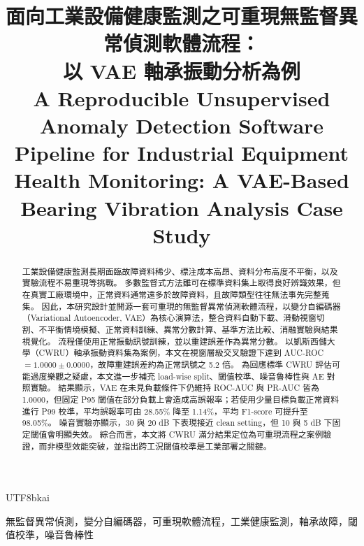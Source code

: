 \documentclass[conference]{IEEEtran}
\begin{document}
\begin{CJK}{UTF8}{bkai}

\title{面向工業設備健康監測之可重現無監督異常偵測軟體流程：\\
以 VAE 軸承振動分析為例\\
\large A Reproducible Unsupervised Anomaly Detection Software Pipeline for Industrial Equipment Health Monitoring: A VAE-Based Bearing Vibration Analysis Case Study}

\author{
}

\maketitle

\begin{abstract}
工業設備健康監測長期面臨故障資料稀少、標注成本高昂、資料分布高度不平衡，以及實驗流程不易重現等挑戰。
多數監督式方法雖可在標準資料集上取得良好辨識效果，但在真實工廠環境中，正常資料通常遠多於故障資料，且故障類型往往無法事先完整蒐集。
因此，本研究設計並開源一套可重現的無監督異常偵測軟體流程，以變分自編碼器（Variational Autoencoder, VAE）為核心演算法，整合資料自動下載、滑動視窗切割、不平衡情境模擬、正常資料訓練、異常分數計算、基準方法比較、消融實驗與結果視覺化。
流程僅使用正常振動訊號訓練，並以重建誤差作為異常分數。
以凱斯西儲大學（CWRU）軸承振動資料集為案例，本文在視窗層級交叉驗證下達到 AUC-ROC $=1.0000\pm0.0000$，故障重建誤差約為正常訊號之 5.2 倍。
為回應標準 CWRU 評估可能過度樂觀之疑慮，本文進一步補充 load-wise split、閾值校準、噪音魯棒性與 AE 對照實驗。
結果顯示，VAE 在未見負載條件下仍維持 ROC-AUC 與 PR-AUC 皆為 1.0000，但固定 P95 閾值在部分負載上會造成高誤報率；若使用少量目標負載正常資料進行 P99 校準，平均誤報率可由 28.55\% 降至 1.14\%，平均 F1-score 可提升至 98.05\%。
噪音實驗亦顯示，30 與 20 dB 下表現接近 clean setting，但 10 與 5 dB 下固定閾值會明顯失效。
綜合而言，本文將 CWRU 滿分結果定位為可重現流程之案例驗證，而非模型效能突破，並指出跨工況閾值校準是工業部署之關鍵。
\end{abstract}

\begin{IEEEkeywords}
無監督異常偵測，變分自編碼器，可重現軟體流程，工業健康監測，軸承故障，閾值校準，噪音魯棒性
\end{IEEEkeywords}


\end{CJK}
\end{document}
